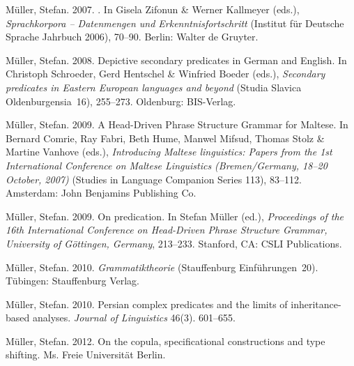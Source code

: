 \begin{thebibliography}{1420}
M{\"u}ller, Stefan. 2007{}.
.
\newblock In Gisela Zifonun \& Werner Kallmeyer (eds.), \emph{{Sprachkorpora --
  Datenmengen und Erkenntnisfortschritt}}  (Institut f{\"u}r Deutsche Sprache
  Jahrbuch 2006), 70--90. Berlin: Walter de Gruyter.

M{\"u}ller, Stefan. 2008.
\newblock Depictive secondary predicates in {German} and {English}.
\newblock In Christoph Schroeder, Gerd Hentschel \& Winfried Boeder (eds.),
  \emph{Secondary predicates in {Eastern European} languages and beyond}
  (Studia Slavica Oldenburgensia~16), 255--273. Oldenburg: BIS-Verlag.

M{\"u}ller, Stefan. 2009{}.
\newblock A {{Head-Driven Phrase Structure Grammar}} for {Maltese}.
\newblock In Bernard Comrie, Ray Fabri, Beth Hume, Manwel Mifsud, Thomas Stolz
  \& Martine Vanhove (eds.), \emph{Introducing {Maltese} linguistics: {Papers}
  from the {1st International Conference on Maltese Linguistics
  (Bremen/Germany, 18--20 October}, 2007)} (Studies in Language Companion
  Series 113), 83--112. Amsterdam: John Benjamins Publishing Co.

M{\"u}ller, Stefan. 2009{}.
\newblock On predication.
\newblock In Stefan M{\"u}ller (ed.), \emph{Proceedings of the {16th
  International Conference on Head-Driven Phrase Structure Grammar, University
  of G{\"o}ttingen, Germany}}, 213--233. Stanford, CA: CSLI Publications.

M{\"u}ller, Stefan. 2010{}.
\newblock \emph{{Grammatiktheorie}} (Stauffenburg Einf{\"u}hrungen~20).
\newblock T{\"u}bingen: Stauffenburg Verlag.

M{\"u}ller, Stefan. 2010{}.
\newblock Persian complex predicates and the limits of inheritance-based
  analyses.
\newblock \emph{Journal of Linguistics} 46(3). 601--655.

M{\"u}ller, Stefan. 2012{}.
\newblock On the copula, specificational constructions and type shifting.
\newblock Ms. Freie Universit{\"a}t Berlin.


\end{thebibliography}
